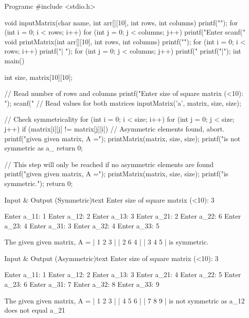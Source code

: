 \documentclass[11pt]{ipu-c}
\begin{document}
    \newpage
    \begin{code}
        {Program}{c}
#include <stdio.h>

void inputMatrix(char name, int arr[][10], int rows, int columns) {
    printf("\n");
    for (int i = 0; i < rows; i++) {
        for (int j = 0; j < columns; j++) {
            printf("Enter %
            scanf("%
        }
    }
}
void printMatrix(int arr[][10], int rows, int columns) {
    printf("\n");
    for (int i = 0; i < rows; i++) {
        printf("| ");
        for (int j = 0; j < columns; j++) {
            printf("%
        }
        printf("|\n");
    }
}
int main() {
    int size, matrix[10][10];

    // Read number of rows and columns
    printf("Enter size of square matrix (<10): ");
    scanf("%
    // Read values for both matrices
    inputMatrix('a', matrix, size, size);

    // Check symmetricality
    for (int i = 0; i < size; i++){
        for (int j = 0; j < size; j++) {
            if (matrix[i][j] != matrix[j][i]) {
                // Asymmetric elements found, abort.
                printf("\nThe given given matrix, A =");
                printMatrix(matrix, size, size);
                printf("is not symmetric as a_%
                return 0;
            }
        }
    }

    // This step will only be reached if no asymmetric elements are found
    printf("\nThe given given matrix, A =");
    printMatrix(matrix, size, size);
    printf("is symmetric.");
    return 0;
}
    \end{code}
    \newpage
    \begin{code}
        {Input \& Output (Symmetric)}{text}
Enter size of square matrix (<10): 3

Enter a_11: 1
Enter a_12: 2
Enter a_13: 3
Enter a_21: 2
Enter a_22: 6
Enter a_23: 4
Enter a_31: 3
Enter a_32: 4
Enter a_33: 5

The given given matrix, A =
| 1 2 3 |
| 2 6 4 |
| 3 4 5 |
is symmetric.
    \end{code}
    \begin{code}
        {Input \& Output (Asymmetric)}{text}
Enter size of square matrix (<10): 3

Enter a_11: 1
Enter a_12: 2
Enter a_13: 3
Enter a_21: 4
Enter a_22: 5
Enter a_23: 6
Enter a_31: 7
Enter a_32: 8
Enter a_33: 9

The given given matrix, A =
| 1 2 3 |
| 4 5 6 |
| 7 8 9 |
is not symmetric as a_12 does not equal a_21
    \end{code}

\end{document}
